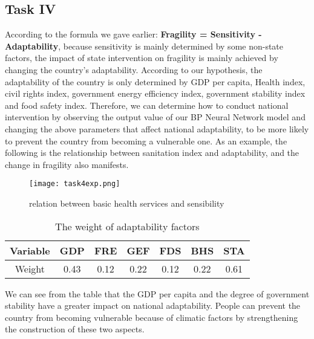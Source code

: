 \documentclass{mcmthesis}
\begin{document}
\subsection{Task IV}
According to the formula we gave earlier:
\textbf{Fragility = Sensitivity - Adaptability}, 
because sensitivity is mainly determined by some non-state 
factors, the impact of state intervention on fragility 
is mainly achieved by changing the country's adaptability. 
According to our hypothesis, the adaptability of the country 
is only determined by GDP per capita, Health index, civil 
rights index, government energy efficiency index, government 
stability index and food safety index. Therefore, we can 
determine how to conduct national intervention by observing 
the output value of our BP Neural Network model and changing 
the above parameters that affect national adaptability, to be 
more likely to prevent the country from becoming a vulnerable 
one. As an example, the following is the relationship between 
sanitation index and adaptability, and the change in fragility 
also manifests.
\newpage
\begin{figure}[htbp]
  \centering
  \texttt{[image: task4exp.png]}
  \caption{relation between basic health services and sensibility}
  \label{fig:sanitation}
\end{figure}
\begin{table}[h]
  \centering
  \begin{tabular} {|c|c|c|c|c|c|c|}  
  \hline  
  Variable & GDP & FRE & GEF & FDS & BHS & STA \\ \hline  
  Weight & 0.43 & 0.12 & 0.22 & 0.12 & 0.22 & 0.61  \\ \hline  
  \end{tabular}  
  \caption{The weight of adaptability factors}
\end{table}
We can see from the table that the GDP per capita and the 
degree of government stability have a greater impact on 
national adaptability. People can prevent the country from 
becoming vulnerable because of climatic factors by strengthening 
the construction of these two aspects.
\end{document}
